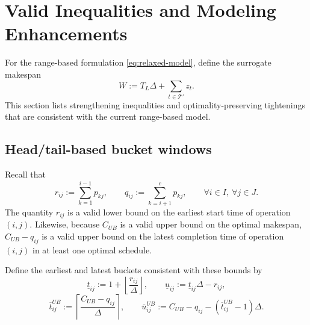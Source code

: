 \documentclass[11pt]{article}
\begin{document}

\section{Valid Inequalities and Modeling Enhancements}

For the range-based formulation \eqref{eq:relaxed-model}, define the surrogate makespan
\[
W:=T_L\Delta+\sum_{t\in\mathcal T'} z_t .
\]
This section lists strengthening inequalities and optimality-preserving tightenings that are consistent with the current range-based model.

\subsection{Head/tail-based bucket windows}

Recall that
\[
r_{ij}:=\sum_{k=1}^{i-1} p_{kj},
\qquad
q_{ij}:=\sum_{k=i+1}^{c} p_{kj},
\qquad \forall i\in I,\ \forall j\in J.
\]
The quantity $r_{ij}$ is a valid lower bound on the earliest start time of operation $(i,j)$.
Likewise, because $C_{UB}$ is a valid upper bound on the optimal makespan, $C_{UB}-q_{ij}$ is a valid upper bound on the latest completion time of operation $(i,j)$ in at least one optimal schedule.

Define the earliest and latest buckets consistent with these bounds by
\[
\underline t_{ij}:=1+\left\lfloor\frac{r_{ij}}{\Delta}\right\rfloor,
\qquad
\underline u_{ij}:=\underline t_{ij}\Delta-r_{ij},
\]
\[
\overline t_{ij}^{UB}:=\left\lceil\frac{C_{UB}-q_{ij}}{\Delta}\right\rceil,
\qquad
\overline u_{ij}^{UB}:=C_{UB}-q_{ij}-(\overline t_{ij}^{UB}-1)\Delta.
\]
\end{document}
